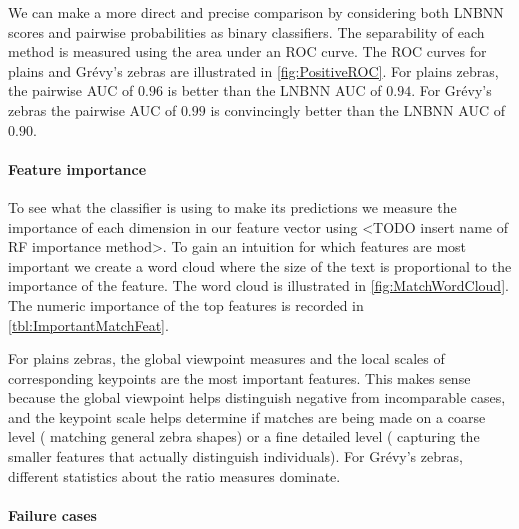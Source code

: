         We can make a more direct and precise comparison by considering both LNBNN scores and pairwise
          probabilities as binary classifiers.
        The separability of each method is measured using the area under an ROC curve.
        The ROC curves for plains and Grévy's zebras are illustrated in \cref{fig:PositiveROC}.
        For plains zebras, the pairwise AUC of $0.96$ is better than the LNBNN AUC of $0.94$.
        For Grévy's zebras the pairwise AUC of $0.99$ is convincingly better than the LNBNN AUC of $0.90$.

        \PositiveROC{}


        \paragraph{Feature importance}
        To see what the classifier is using to make its predictions we measure the importance of each dimension
          in our feature vector using <TODO insert name of RF importance method>.
        To gain an intuition for which features are most important we create a word cloud where the size of the
          text is proportional to the importance of the feature.
        The word cloud is illustrated in \cref{fig:MatchWordCloud}.
        The numeric importance of the top features is recorded in \cref{tbl:ImportantMatchFeat}.

        For plains zebras, the global viewpoint measures and the local scales of corresponding keypoints are the
          most important features.
        This makes sense because the global viewpoint helps distinguish negative from incomparable cases, and the
          keypoint scale helps determine if matches are being made on a coarse level (\eg{} matching general zebra
          shapes) or a fine detailed level (\ie{} capturing the smaller features that actually distinguish
          individuals).
        For Grévy's zebras, different statistics about the ratio measures dominate.



        \MatchWordCloud{}
        \ImportantMatchFeat{}

        \paragraph{Failure cases}

